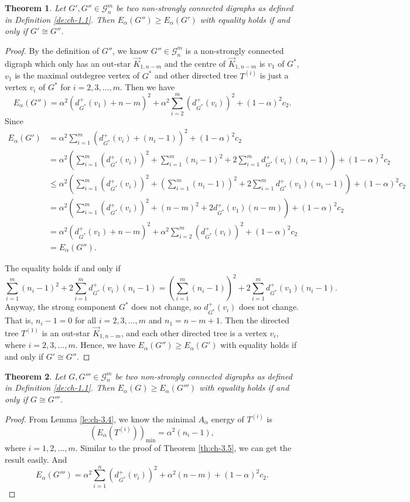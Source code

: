 \documentclass[11pt]{article}
\newtheorem{theorem}{Theorem}[section]
\begin{document}
\noindent\begin{theorem}\label{th:ch-3.6} Let $G',G''\in\mathcal{G}_n^m$ be two non-strongly connected digraphs as defined in Definition \ref{de:ch-1.1}. Then $E_\alpha(G'')\geq E_\alpha(G')$ with equality holds if and only if $G'\cong G''$.
\end{theorem}
\begin{proof}
By the definition of $G''$, we know $G''\in\mathcal{G}_n^m$ is a non-strongly connected digraph which only has an out-star $\stackrel{\rightarrow}{K}_{1,n-m}$ and the centre of $\stackrel{\rightarrow}{K}_{1,n-m}$ is $v_1$ of $G^*$, $v_1$ is the maximal outdegree vertex of $G^*$ and other directed tree $T^{(i)}$ is just a vertex $v_i$ of $G^*$ for $i=2,3,\ldots,m$. Then we have
$$E_\alpha(G'')=\alpha^2\left(d_{G^*}^+(v_1)+n-m\right)^2+\alpha^2\sum_{i=2}^m(d_{G^*}^+(v_i))^2+(1-\alpha)^2c_2.$$
Since
\begin{align*}
E_\alpha(G')&=\alpha^2\sum_{i=1}^m\left(d_{G^*}^+(v_i)+(n_i-1)\right)^2+(1-\alpha)^2c_2\\
&=\alpha^2\left(\sum_{i=1}^m(d_{G^*}^+(v_i))^2+\sum_{i=1}^m(n_i-1)^2+2\sum_{i=1}^md_{G^*}^+(v_i)(n_i-1)\right)+(1-\alpha)^2c_2\\
&\leq\alpha^2\left(\sum_{i=1}^m(d_{G^*}^+(v_i))^2+\left(\sum_{i=1}^m(n_i-1)\right)^2+2\sum_{i=1}^md_{G^*}^+(v_1)(n_i-1)\right)+(1-\alpha)^2c_2\\
&=\alpha^2\left(\sum_{i=1}^m(d_{G^*}^+(v_i))^2+(n-m)^2+2d_{G^*}^+(v_1)(n-m)\right)+(1-\alpha)^2c_2\\
&=\alpha^2\left(d_{G^*}^+(v_1)+n-m\right)^2+\alpha^2\sum_{i=2}^m(d_{G^*}^+(v_i))^2+(1-\alpha)^2c_2\\
&=E_\alpha(G'').
\end{align*}

The equality holds if and only if
$$\sum_{i=1}^m(n_i-1)^2+2\sum_{i=1}^md_{G^*}^+(v_i)(n_i-1)=\left(\sum_{i=1}^m(n_i-1)\right)^2+2\sum_{i=1}^md_{G^*}^+(v_1)(n_i-1).$$
Anyway, the strong component $G^*$ does not change, so $d_{G^*}^+(v_i)$ does not change. That is, $n_i-1=0$ for all $i=2,3,\ldots,m$ and $n_1=n-m+1$. Then the directed tree $T^{(1)}$ is an out-star $\stackrel{\rightarrow}{K}_{1,n-m}$, and each other directed tree is a vertex $v_i$, where $i=2,3,\ldots,m$. Hence, we have $E_\alpha(G'')\geq E_\alpha(G')$ with equality holds if and only if $G'\cong G''$.
\end{proof}

\noindent\begin{theorem}\label{th:ch-3.7} Let $G,G'''\in\mathcal{G}_n^m$ be two non-strongly connected digraphs as defined in Definition \ref{de:ch-1.1}. Then $E_\alpha(G)\geq E_\alpha(G''')$ with equality holds if and only if $G\cong G'''$.
\end{theorem}
\begin{proof}
From Lemma \ref{le:ch-3.4}, we know the minimal $A_\alpha$ energy of $T^{(i)}$ is
$$\left(E_\alpha(T^{(i)})\right)_{\mathrm{min}}=\alpha^2(n_i-1),$$
where $i=1,2,\ldots,m$. Similar to the proof of Theorem \ref{th:ch-3.5}, we can get the result easily. And
$$E_\alpha(G''')=\alpha^2\sum_{i=1}^n(d_{G^*}^+(v_i))^2+\alpha^2(n-m)+(1-\alpha)^2c_2.$$
\end{proof}
\end{document}
